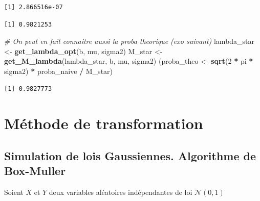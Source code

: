 \documentclass[]{article}
\newenvironment{Shaded}{\begin{snugshade}}{\end{snugshade}}
\newcommand{\CommentTok}[1]{\textcolor[rgb]{0.56,0.35,0.01}{\textit{#1}}}
\newcommand{\DecValTok}[1]{\textcolor[rgb]{0.00,0.00,0.81}{#1}}
\newcommand{\KeywordTok}[1]{\textcolor[rgb]{0.13,0.29,0.53}{\textbf{#1}}}
\newcommand{\NormalTok}[1]{#1}
\newcommand{\OperatorTok}[1]{\textcolor[rgb]{0.81,0.36,0.00}{\textbf{#1}}}
\newcommand{\StringTok}[1]{\textcolor[rgb]{0.31,0.60,0.02}{#1}}
\begin{document}
\begin{verbatim}
[1] 2.866516e-07
\end{verbatim}

\begin{Shaded}
\end{Shaded}

\begin{verbatim}
[1] 0.9821253
\end{verbatim}

\begin{Shaded}
\begin{Highlighting}[]
\CommentTok{# On peut en fait connaitre aussi la proba theorique (exo suivant)}
\NormalTok{lambda_star <-}\StringTok{ }\KeywordTok{get_lambda_opt}\NormalTok{(b, mu, sigma2)}
\NormalTok{M_star <-}\StringTok{ }\KeywordTok{get_M_lambda}\NormalTok{(lambda_star, b, mu, sigma2)}
\NormalTok{(proba_theo <-}\StringTok{ }\KeywordTok{sqrt}\NormalTok{(}\DecValTok{2} \OperatorTok{*}\StringTok{ }\NormalTok{pi }\OperatorTok{*}\StringTok{ }\NormalTok{sigma2) }\OperatorTok{*}\StringTok{ }\NormalTok{proba_naive }\OperatorTok{/}\StringTok{ }\NormalTok{M_star)}
\end{Highlighting}
\end{Shaded}

\begin{verbatim}
[1] 0.9827773
\end{verbatim}

\hypertarget{muxe9thode-de-transformation}{%
\section{Méthode de transformation}\label{muxe9thode-de-transformation}}

\hypertarget{simulation-de-lois-gaussiennes.-algorithme-de-box-muller}{%
\subsection{Simulation de lois Gaussiennes. Algorithme de
Box-Muller}\label{simulation-de-lois-gaussiennes.-algorithme-de-box-muller}}

Soient \(X\) et \(Y\) deux variables aléatoires indépendantes de loi
\(\mathcal{N}(0, 1)\)
\end{document}
